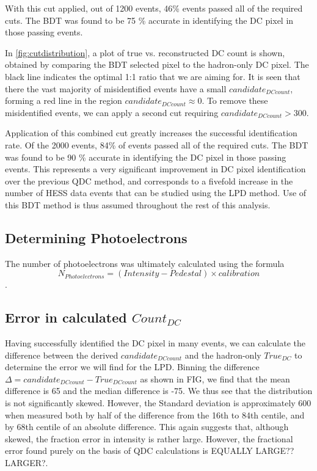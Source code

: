 \documentclass{article}
\begin{document}
With this cut applied, out of 1200 events, 46\% events passed all of the required cuts. The BDT was found to be 75 \% accurate in identifying the DC pixel in those passing events.

In \ref{fig:cutdistribution}, a plot of true vs. reconstructed DC count is shown, obtained by comparing the BDT selected pixel to the hadron-only DC pixel. The black line indicates the optimal 1:1 ratio that we are aiming for. It is seen that there the vast majority of misidentified events have a small $candidate_{DC count}$, forming a red line in the region $candidate_{DC count} \approx 0$. To remove these misidentified events, we can apply a second cut requiring $candidate_{DC count} > 300$.

Application of this combined cut greatly increases the successful identification rate. Of the 2000 events, 84\% of events passed all of the required cuts. The BDT was found to be 90 \% accurate in identifying the DC pixel in those passing events. This represents a very significant improvement in DC pixel identification over the previous QDC method, and corresponds to a fivefold increase in the number of HESS data events that can be studied using the LPD method. Use of this BDT method is thus assumed throughout the rest of this analysis.

\subsection{Determining Photoelectrons}
The number of photoelectrons was ultimately calculated using the formula \[N_{Photoelectrons} = (Intensity-Pedestal)\times calibration\].

\subsection{Error in calculated $Count_{DC}$}
Having successfully identified the DC pixel in many events, we can calculate the difference between the derived $candidate_{DC count}$ and the hadron-only $True_{DC}$ to determine the error we will find for the LPD. Binning the difference $\Delta = candidate_{DC count} - True_{DC count}$ as shown in FIG, we find that the mean difference is 65 and the median difference is -75. We thus see that the distribution is not significantly skewed. However, the Standard deviation is approximately 600 when measured both by half of the difference from the 16th to 84th centile, and by 68th centile of an absolute difference. This again suggests that, although skewed, the fraction error in intensity is rather large. However, the fractional error found purely on the basis of QDC calculations is EQUALLY LARGE??LARGER?.
\end{document}
